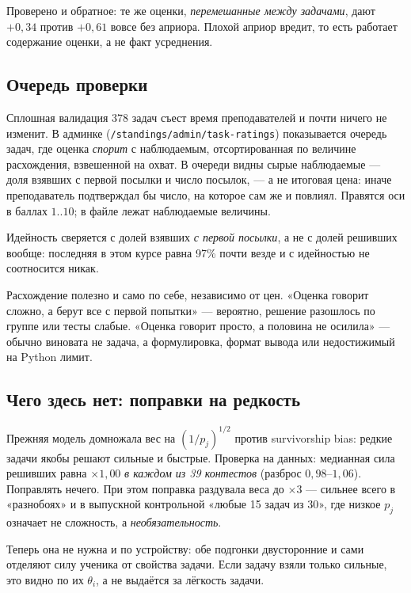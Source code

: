 \documentclass[11pt,a4paper]{article}
\begin{document}
Проверено и обратное: те же оценки, \emph{перемешанные между задачами}, дают
$+0{,}34$ против $+0{,}61$ вовсе без априора. Плохой априор вредит, то есть
работает содержание оценки, а не факт усреднения.

\subsection*{Очередь проверки}

Сплошная валидация 378 задач съест время преподавателей и почти ничего не
изменит. В админке (\texttt{/standings/admin/task-ratings}) показывается очередь
задач, где оценка \emph{спорит} с наблюдаемым, отсортированная по величине
расхождения, взвешенной на охват. В очереди видны сырые наблюдаемые --- доля
взявших с первой посылки и число посылок, --- а не итоговая цена: иначе
преподаватель подтверждал бы число, на которое сам же и повлиял. Правятся оси в
баллах $1..10$; в файле лежат наблюдаемые величины.

Идейность сверяется с долей взявших \emph{с первой посылки}, а не с долей
решивших вообще: последняя в этом курсе равна 97\% почти везде и с идейностью не
соотносится никак.

Расхождение полезно и само по себе, независимо от цен. «Оценка говорит сложно, а
берут все с первой попытки» --- вероятно, решение разошлось по группе или тесты
слабые. «Оценка говорит просто, а половина не осилила» --- обычно виновата не
задача, а формулировка, формат вывода или недостижимый на Python лимит.

\subsection*{Чего здесь нет: поправки на редкость}

Прежняя модель домножала вес на $(1/p_j)^{1/2}$ против survivorship bias:
редкие задачи якобы решают сильные и быстрые. Проверка на данных: медианная
сила решивших равна $\times 1{,}00$ \emph{в каждом из 39 контестов} (разброс
$0{,}98$--$1{,}06$). Поправлять нечего. При этом поправка раздувала веса до
$\times 3$ --- сильнее всего в «разнобоях» и в выпускной контрольной «любые 15
задач из 30», где низкое $p_j$ означает не сложность, а \emph{необязательность}.

Теперь она не нужна и по устройству: обе подгонки двусторонние и сами отделяют
силу ученика от свойства задачи. Если задачу взяли только сильные, это видно по
их $\theta_i$, а не выдаётся за лёгкость задачи.
\end{document}
